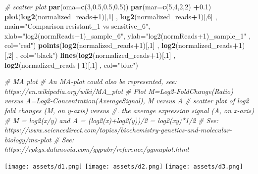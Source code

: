 \documentclass[
]{article}
\newenvironment{Shaded}{\begin{snugshade}}{\end{snugshade}}
\newcommand{\AttributeTok}[1]{\textcolor[rgb]{0.13,0.29,0.53}{#1}}
\newcommand{\CommentTok}[1]{\textcolor[rgb]{0.56,0.35,0.01}{\textit{#1}}}
\newcommand{\DecValTok}[1]{\textcolor[rgb]{0.00,0.00,0.81}{#1}}
\newcommand{\FloatTok}[1]{\textcolor[rgb]{0.00,0.00,0.81}{#1}}
\newcommand{\FunctionTok}[1]{\textcolor[rgb]{0.13,0.29,0.53}{\textbf{#1}}}
\newcommand{\NormalTok}[1]{#1}
\newcommand{\SpecialCharTok}[1]{\textcolor[rgb]{0.81,0.36,0.00}{\textbf{#1}}}
\newcommand{\StringTok}[1]{\textcolor[rgb]{0.31,0.60,0.02}{#1}}
\begin{document}
\begin{Shaded}
\begin{Highlighting}[]
\CommentTok{\# scatter plot}
\FunctionTok{par}\NormalTok{(}\AttributeTok{oma=}\FunctionTok{c}\NormalTok{(}\DecValTok{3}\NormalTok{,}\FloatTok{0.5}\NormalTok{,}\FloatTok{0.5}\NormalTok{,}\FloatTok{0.5}\NormalTok{))}
\FunctionTok{par}\NormalTok{(}\AttributeTok{mar=}\FunctionTok{c}\NormalTok{(}\DecValTok{5}\NormalTok{,}\DecValTok{4}\NormalTok{,}\DecValTok{2}\NormalTok{,}\DecValTok{2}\NormalTok{) }\SpecialCharTok{+}\FloatTok{0.1}\NormalTok{)}
\FunctionTok{plot}\NormalTok{(}\FunctionTok{log2}\NormalTok{(normalized\_reads}\SpecialCharTok{+}\DecValTok{1}\NormalTok{)[,}\DecValTok{1}\NormalTok{] , }\FunctionTok{log2}\NormalTok{(normalized\_reads}\SpecialCharTok{+}\DecValTok{1}\NormalTok{)[,}\DecValTok{6}\NormalTok{] , }
     \AttributeTok{main=}\StringTok{"Comparison resistant\_1 vs sensitive\_6"}\NormalTok{,}
     \AttributeTok{xlab=}\StringTok{"log2(normReads+1)\_sample\_6"}\NormalTok{, }
     \AttributeTok{ylab=}\StringTok{"log2(normReads+1)\_sample\_1"}\NormalTok{ , }\AttributeTok{col=}\StringTok{"red"}\NormalTok{)}
\FunctionTok{points}\NormalTok{(}\FunctionTok{log2}\NormalTok{(normalized\_reads}\SpecialCharTok{+}\DecValTok{1}\NormalTok{)[,}\DecValTok{1}\NormalTok{] , }\FunctionTok{log2}\NormalTok{(normalized\_reads}\SpecialCharTok{+}\DecValTok{1}\NormalTok{)[,}\DecValTok{2}\NormalTok{] , }\AttributeTok{col=}\StringTok{"black"}\NormalTok{)}
\FunctionTok{lines}\NormalTok{(}\FunctionTok{log2}\NormalTok{(normalized\_reads}\SpecialCharTok{+}\DecValTok{1}\NormalTok{)[,}\DecValTok{1}\NormalTok{] , }\FunctionTok{log2}\NormalTok{(normalized\_reads}\SpecialCharTok{+}\DecValTok{1}\NormalTok{)[,}\DecValTok{1}\NormalTok{] , }\AttributeTok{col=}\StringTok{"blue"}\NormalTok{)}

\CommentTok{\# MA plot}
\CommentTok{\# An MA{-}plot could also be represented, see: https://en.wikipedia.org/wiki/MA\_plot }
\CommentTok{\# Plot M=Log2{-}FoldChange(Ratio) versus A=Log2{-}Concentration(AverageSignal), M versus A}
\CommentTok{\# scatter plot of log2 fold changes (M, on y{-}axis) versus }
\CommentTok{\#.                the average expression signal (A, on x{-}axis)}
\CommentTok{\# M = log2(x/y) and A = (log2(x)+log2(y))/2 = log2(xy)*1/2}
\CommentTok{\# See: https://www.sciencedirect.com/topics/biochemistry{-}genetics{-}and{-}molecular{-}biology/ma{-}plot}
\CommentTok{\# See: https://rpkgs.datanovia.com/ggpubr/reference/ggmaplot.html}
\end{Highlighting}
\end{Shaded}

\texttt{[image: assets/d1.png]}
\texttt{[image: assets/d2.png]}
\texttt{[image: assets/d3.png]}
\end{document}
